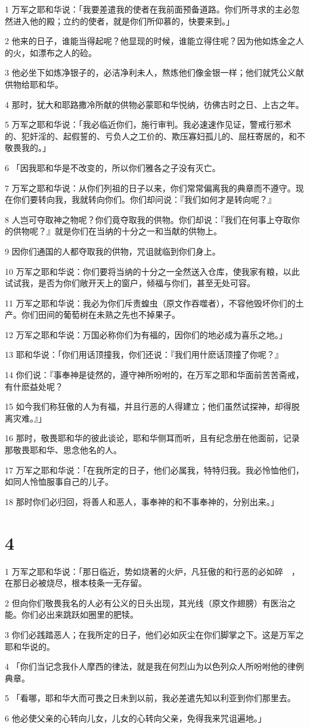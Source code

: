 \par 1 万军之耶和华说：「我要差遣我的使者在我前面预备道路。你们所寻求的主必忽然进入他的殿；立约的使者，就是你们所仰慕的，快要来到。」
\par 2 他来的日子，谁能当得起呢？他显现的时候，谁能立得住呢？因为他如炼金之人的火，如漂布之人的硷。
\par 3 他必坐下如炼净银子的，必洁净利未人，熬炼他们像金银一样；他们就凭公义献供物给耶和华。
\par 4 那时，犹大和耶路撒冷所献的供物必蒙耶和华悦纳，彷佛古时之日、上古之年。
\par 5 万军之耶和华说：「我必临近你们，施行审判。我必速速作见证，警戒行邪术的、犯奸淫的、起假誓的、亏负人之工价的、欺压寡妇孤儿的、屈枉寄居的，和不敬畏我的。」
\par 6 「因我耶和华是不改变的，所以你们雅各之子没有灭亡。
\par 7 万军之耶和华说：从你们列祖的日子以来，你们常常偏离我的典章而不遵守。现在你们要转向我，我就转向你们。你们却问说：『我们如何才是转向呢？』
\par 8 人岂可夺取神之物呢？你们竟夺取我的供物。你们却说：『我们在何事上夺取你的供物呢？』就是你们在当纳的十分之一和当献的供物上。
\par 9 因你们通国的人都夺取我的供物，咒诅就临到你们身上。
\par 10 万军之耶和华说：你们要将当纳的十分之一全然送入仓库，使我家有粮，以此试试我，是否为你们敞开天上的窗户，倾福与你们，甚至无处可容。
\par 11 万军之耶和华说：我必为你们斥责蝗虫（原文作吞噬者），不容他毁坏你们的土产。你们田间的葡萄树在未熟之先也不掉果子。
\par 12 万军之耶和华说：万国必称你们为有福的，因你们的地必成为喜乐之地。」
\par 13 耶和华说：「你们用话顶撞我，你们还说：『我们用什麽话顶撞了你呢？』
\par 14 你们说：『事奉神是徒然的，遵守神所吩咐的，在万军之耶和华面前苦苦斋戒，有什麽益处呢？
\par 15 如今我们称狂傲的人为有福，并且行恶的人得建立；他们虽然试探神，却得脱离灾难。』」
\par 16 那时，敬畏耶和华的彼此谈论，耶和华侧耳而听，且有纪念册在他面前，记录那敬畏耶和华、思念他名的人。
\par 17 万军之耶和华说：「在我所定的日子，他们必属我，特特归我。我必怜恤他们，如同人怜恤服事自己的儿子。
\par 18 那时你们必归回，将善人和恶人，事奉神的和不事奉神的，分别出来。」

\chapter{4}

\par 1 万军之耶和华说：「那日临近，势如烧著的火炉，凡狂傲的和行恶的必如碎　，在那日必被烧尽，根本枝条一无存留。
\par 2 但向你们敬畏我名的人必有公义的日头出现，其光线（原文作翅膀）有医治之能。你们必出来跳跃如圈里的肥犊。
\par 3 你们必践踏恶人；在我所定的日子，他们必如灰尘在你们脚掌之下。这是万军之耶和华说的。
\par 4 「你们当记念我仆人摩西的律法，就是我在何烈山为以色列众人所吩咐他的律例典章。
\par 5 「看哪，耶和华大而可畏之日未到以前，我必差遣先知以利亚到你们那里去。
\par 6 他必使父亲的心转向儿女，儿女的心转向父亲，免得我来咒诅遍地。」


